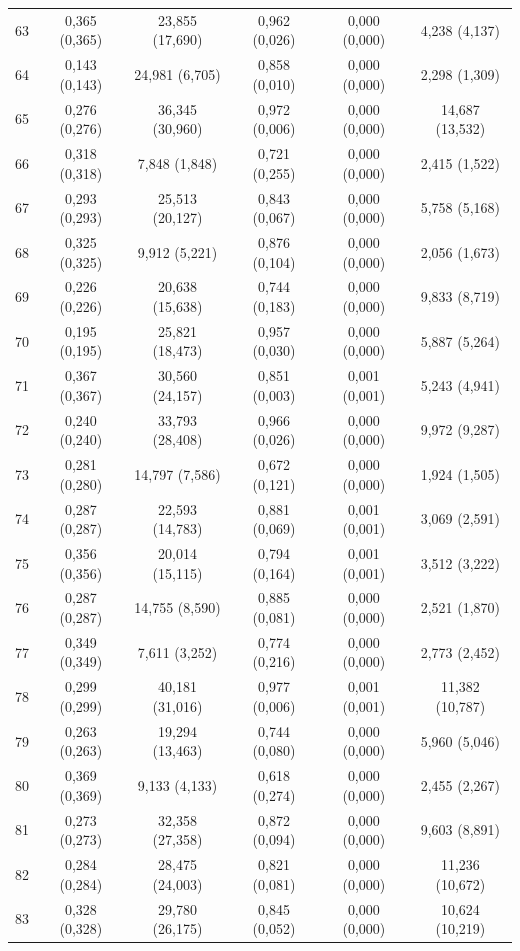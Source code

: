 \begin{tabular}{l c c c c c}
63 & 0,365 (0,365) & 23,855 (17,690) & 0,962 (0,026) & 0,000 (0,000) & 4,238 (4,137) \\
64 & 0,143 (0,143) & 24,981 (6,705) & 0,858 (0,010) & 0,000 (0,000) & 2,298 (1,309) \\
65 & 0,276 (0,276) & 36,345 (30,960) & 0,972 (0,006) & 0,000 (0,000) & 14,687 (13,532) \\
66 & 0,318 (0,318) & 7,848 (1,848) & 0,721 (0,255) & 0,000 (0,000) & 2,415 (1,522) \\
67 & 0,293 (0,293) & 25,513 (20,127) & 0,843 (0,067) & 0,000 (0,000) & 5,758 (5,168) \\
68 & 0,325 (0,325) & 9,912 (5,221) & 0,876 (0,104) & 0,000 (0,000) & 2,056 (1,673) \\
69 & 0,226 (0,226) & 20,638 (15,638) & 0,744 (0,183) & 0,000 (0,000) & 9,833 (8,719) \\
70 & 0,195 (0,195) & 25,821 (18,473) & 0,957 (0,030) & 0,000 (0,000) & 5,887 (5,264) \\
71 & 0,367 (0,367) & 30,560 (24,157) & 0,851 (0,003) & 0,001 (0,001) & 5,243 (4,941) \\
72 & 0,240 (0,240) & 33,793 (28,408) & 0,966 (0,026) & 0,000 (0,000) & 9,972 (9,287) \\
73 & 0,281 (0,280) & 14,797 (7,586) & 0,672 (0,121) & 0,000 (0,000) & 1,924 (1,505) \\
74 & 0,287 (0,287) & 22,593 (14,783) & 0,881 (0,069) & 0,001 (0,001) & 3,069 (2,591) \\
75 & 0,356 (0,356) & 20,014 (15,115) & 0,794 (0,164) & 0,001 (0,001) & 3,512 (3,222) \\
76 & 0,287 (0,287) & 14,755 (8,590) & 0,885 (0,081) & 0,000 (0,000) & 2,521 (1,870) \\
77 & 0,349 (0,349) & 7,611 (3,252) & 0,774 (0,216) & 0,000 (0,000) & 2,773 (2,452) \\
78 & 0,299 (0,299) & 40,181 (31,016) & 0,977 (0,006) & 0,001 (0,001) & 11,382 (10,787) \\
79 & 0,263 (0,263) & 19,294 (13,463) & 0,744 (0,080) & 0,000 (0,000) & 5,960 (5,046) \\
80 & 0,369 (0,369) & 9,133 (4,133) & 0,618 (0,274) & 0,000 (0,000) & 2,455 (2,267) \\
81 & 0,273 (0,273) & 32,358 (27,358) & 0,872 (0,094) & 0,000 (0,000) & 9,603 (8,891) \\
82 & 0,284 (0,284) & 28,475 (24,003) & 0,821 (0,081) & 0,000 (0,000) & 11,236 (10,672) \\
83 & 0,328 (0,328) & 29,780 (26,175) & 0,845 (0,052) & 0,000 (0,000) & 10,624 (10,219) \\

\end{tabular}
